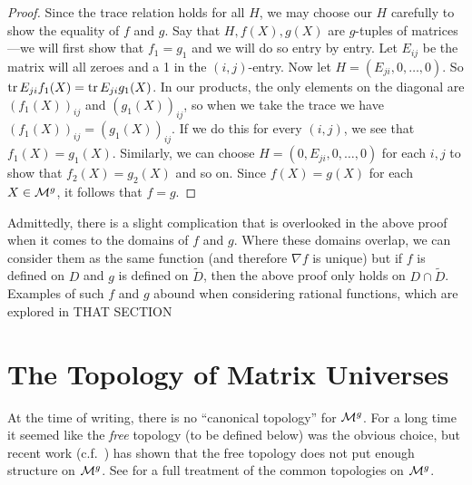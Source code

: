 \begin{proof}
  Since the trace relation holds for all $H$, we may choose our $H$ carefully to
  show the equality of $f$ and $g$. Say that $H,f(X),g(X)$ are $g$-tuples of
  matrices---we will first show that $f_1=g_1$ and we will do so entry by entry.
  Let $E_{ij}$ be the matrix will all zeroes and a 1 in the $(i,j)$-entry.  Now
  let $H= (E_{ji},0, \dots ,0)$. So $\operatorname{tr} E_{ji}f_1(X) = \operatorname{tr} E_{ji}g_1(X)$.
  In our products, the only elements on the diagonal are $(f_1(X))_{ij}$ and
  $(g_1(X))_{ij}$, so when we take the trace we have $(f_1(X))_{ij} =(g_1(X))_{ij}$. If we
  do this for every $(i,j)$, we see that $f_1(X)=g_1(X)$. Similarly, we can choose
  \(H = ( 0, E_{ji},0, \dots, 0)\) for each \(i,j\) to show that \(f_2(X)=g_2(X)\) and
  so on. Since \(f(X)=g(X)\) for each \(X \in \mathcal{M}^{g} \), it follows that \(f=g\).
\end{proof}

Admittedly, there is a slight complication that is overlooked in the above proof
when it comes to the domains of \(f\) and \(g\). Where these domains overlap, we
can consider them as the same function (and therefore \(\nabla f \) is unique)
but if \(f\) is defined on \(D\) and \(g\) is defined on \(\tilde{D}\), then the
above proof only holds on \(D \cap \tilde{D}\). Examples of such \(f\) and \(g\)
abound when considering rational functions, which are explored in {\color{blue}
  THAT SECTION}
\section{The Topology of Matrix Universes }%
\label{sec:TopManUniv}

At the time of writing, there is no ``canonical topology'' for \(\mathcal{M}^g\). For a
long time it seemed like the \emph{free} topology (to be defined below) was the
obvious choice, but recent work (c.f.\ \cite{pascoeentire2019}) has shown that the free
topology does not put enough structure on \(\mathcal{M}^g\). See \cite{aglerAspects2016}
for a full treatment of the common topologies on \(\mathcal{M}^g\).

